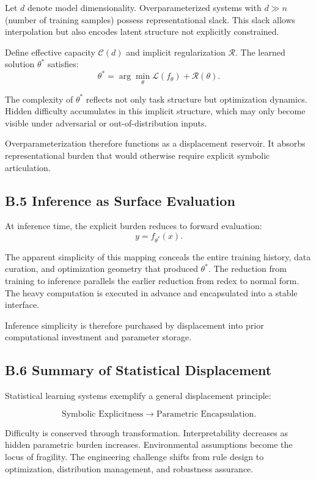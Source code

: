 \documentclass[11pt]{article}
\begin{document}
Let $d$ denote model dimensionality. Overparameterized systems with $d \gg n$ (number of training samples) possess representational slack. This slack allows interpolation but also encodes latent structure not explicitly constrained.

Define effective capacity $\mathcal{C}(d)$ and implicit regularization $\mathcal{R}$. The learned solution $\theta^*$ satisfies:
\[
\theta^* = \arg\min_{\theta} \mathcal{L}(f_\theta) + \mathcal{R}(\theta).
\]

The complexity of $\theta^*$ reflects not only task structure but optimization dynamics. Hidden difficulty accumulates in this implicit structure, which may only become visible under adversarial or out-of-distribution inputs.

Overparameterization therefore functions as a displacement reservoir. It absorbs representational burden that would otherwise require explicit symbolic articulation.

\subsection{B.5 Inference as Surface Evaluation}

At inference time, the explicit burden reduces to forward evaluation:
\[
y = f_{\theta^*}(x).
\]

The apparent simplicity of this mapping conceals the entire training history, data curation, and optimization geometry that produced $\theta^*$. The reduction from training to inference parallels the earlier reduction from redex to normal form. The heavy computation is executed in advance and encapsulated into a stable interface.

Inference simplicity is therefore purchased by displacement into prior computational investment and parameter storage.

\subsection{B.6 Summary of Statistical Displacement}

Statistical learning systems exemplify a general displacement principle:

\[
\text{Symbolic Explicitness} \longrightarrow \text{Parametric Encapsulation}.
\]

Difficulty is conserved through transformation. Interpretability decreases as hidden parametric burden increases. Environmental assumptions become the locus of fragility. The engineering challenge shifts from rule design to optimization, distribution management, and robustness assurance.
\end{document}
